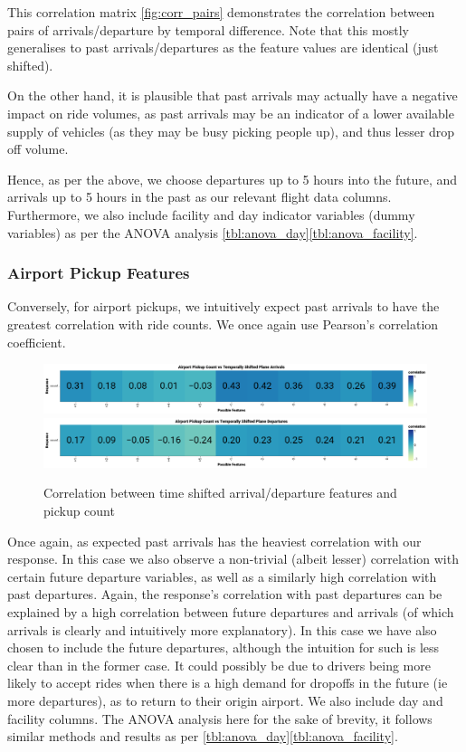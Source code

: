 \documentclass[11pt]{article}
\begin{document}
This correlation matrix \ref{fig:corr_pairs} demonstrates the correlation between pairs of arrivals/departure by temporal difference. Note that this mostly generalises to past arrivals/departures as the feature values are identical (just shifted).

On the other hand, it is plausible that past arrivals may actually have a negative impact on ride volumes, as past arrivals may be an indicator of a lower available supply of vehicles (as they may be busy picking people up), and thus lesser drop off volume. 

Hence, as per the above, we choose departures up to 5 hours into the future, and arrivals up to 5 hours in the past as our relevant flight data columns. Furthermore, we also include facility and day indicator variables (dummy variables) as per the ANOVA analysis \ref{tbl:anova_day}\ref{tbl:anova_facility}.
\subsubsection{Airport Pickup Features}

Conversely, for airport pickups, we intuitively expect past arrivals to have the greatest correlation with ride counts. We once again use Pearson's correlation coefficient.
\begin{figure}[h!]
    \centering
    \caption{Correlation between time shifted arrival/departure features and pickup count}
\includegraphics[width=1\textwidth]{plots/pickup_arrival_corr.png}
\includegraphics[width=1\textwidth]{plots/pickup_departure_corr.png}

\end{figure}

Once again, as expected past arrivals has the heaviest correlation with our response. In this case we also observe a non-trivial (albeit lesser) correlation with certain future departure variables, as well as a similarly high correlation with past departures. Again, the response's correlation with past departures can be explained by a high correlation between future departures and arrivals (of which arrivals is clearly and intuitively more explanatory). In this case we have also chosen to include the future departures, although the intuition for such is less clear than in the former case. It could possibly be due to drivers being more likely to accept rides when there is a high demand for dropoffs in the future (ie more departures), as to return to their origin airport. We also include day and facility columns. The ANOVA analysis here for the sake of brevity, it follows similar methods and results as per \ref{tbl:anova_day}\ref{tbl:anova_facility}.
\end{document}
